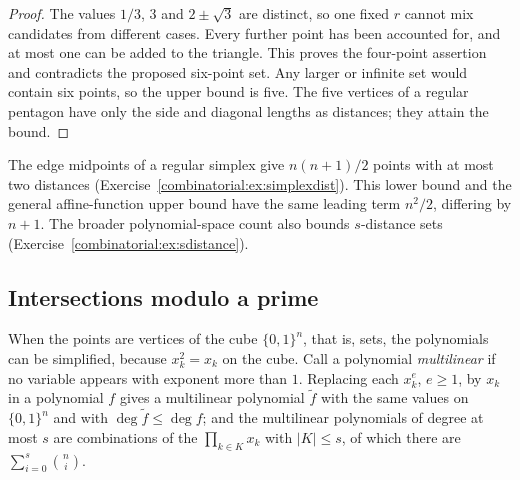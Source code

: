 \begin{proof}
The values $1/3$, $3$ and $2\pm\sqrt3$ are distinct, so one fixed $r$
cannot mix candidates from different cases. Every further point has been
accounted for, and at most one can be added to the triangle. This proves
the four-point assertion and contradicts the proposed six-point set.
Any larger or infinite set would contain six points, so the upper bound
is five. The five vertices of a regular pentagon have only the side and
diagonal lengths as distances; they attain the bound.
\end{proof}

The edge midpoints of a regular simplex give $n(n+1)/2$ points with at most
two distances (Exercise~\ref{combinatorial:ex:simplexdist}). This lower bound
and the general affine-function upper bound have the same leading term
$n^2/2$, differing by $n+1$.
The broader polynomial-space count also bounds $s$-distance sets
(Exercise~\ref{combinatorial:ex:sdistance}).

\subsection*{Intersections modulo a prime}

When the points are vertices of the cube $\{0,1\}^n$, that is, sets, the polynomials can be simplified, because $x_k^2=x_k$ on the cube. Call a polynomial \emph{multilinear} if no variable appears with
exponent more than $1$. Replacing each $x_k^e$, $e\ge1$, by $x_k$ in a polynomial $f$ gives a multilinear polynomial $\tilde f$ with the same values on $\{0,1\}^n$ and with $\deg\tilde f\le\deg f$; and the
multilinear polynomials of degree at most $s$ are combinations of the $\prod_{k\in K}x_k$ with $|K|\le s$, of which there are $\sum_{i=0}^s\binom ni$.

